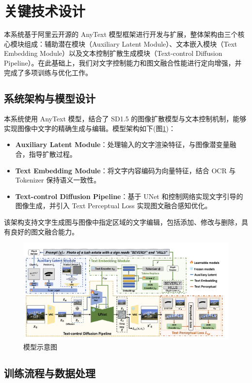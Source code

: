 \documentclass[a4paper,12pt]{article}
\begin{document}
\section{关键技术设计}
本系统基于阿里云开源的 AnyText 模型框架进行开发与扩展，整体架构由三个核心模块组成：辅助潜在模块（Auxiliary Latent Module）、文本嵌入模块（Text Embedding Module）以及文本控制扩散生成模块（Text-control Diffusion Pipeline）。在此基础上，我们对文字控制能力和图文融合性能进行定向增强，并完成了多项训练与优化工作。

\subsection{系统架构与模型设计}
本系统使用 AnyText 模型，结合了 SD1.5 的图像扩散模型与文本控制机制，能够实现图像中文字的精确生成与编辑。模型架构如下(图\ref{fig:fusion})：

\begin{itemize}
    \item \textbf{Auxiliary Latent Module}：处理输入的文字渲染特征，与图像潜变量融合，指导扩散过程。
    \item \textbf{Text Embedding Module}：将文字内容编码为向量特征，结合 OCR 与 Tokenizer 保持语义一致性。
    \item \textbf{Text-control Diffusion Pipeline}：基于 UNet 和控制网络实现文字引导的图像生成，并引入 Text Perceptual Loss 实现图文融合感知优化。
\end{itemize}

该架构支持文字生成图与图像中指定区域的文字编辑，包括添加、修改与删除，具有良好的图文融合能力。
\begin{figure}[htbp]
  \centering
  \includegraphics[width=1\textwidth]{Image/image1.png}
  \caption{模型示意图}
  \label{fig:fusion}
\end{figure}

\subsection{训练流程与数据处理}
\end{document}
